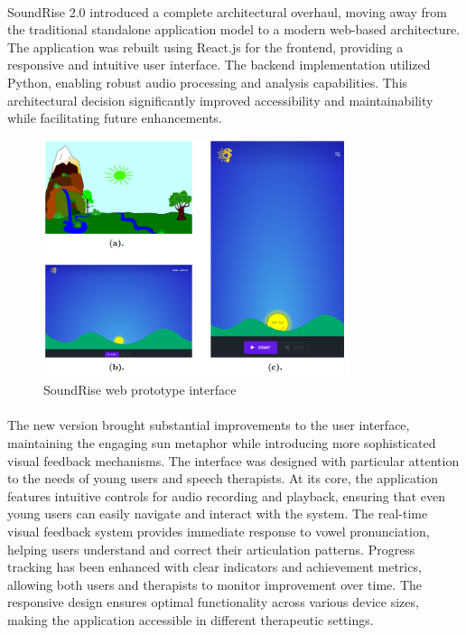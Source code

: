 \paragraph{}
SoundRise 2.0 introduced a complete architectural overhaul, moving away from the traditional standalone application model to a modern web-based architecture. The application was rebuilt using React.js for the frontend, providing a responsive and intuitive user interface. The backend implementation utilized Python, enabling robust audio processing and analysis capabilities. This architectural decision significantly improved accessibility and maintainability while facilitating future enhancements.

\begin{figure}[h]
    \centering
    \includegraphics[width=0.8\textwidth]{res/images/background/soundrise-2.png}
    \caption{SoundRise web prototype interface}
    \label{fig:soundrise-2}
\end{figure}

\paragraph{}
The new version brought substantial improvements to the user interface, maintaining the engaging sun metaphor while introducing more sophisticated visual feedback mechanisms. The interface was designed with particular attention to the needs of young users and speech therapists. At its core, the application features intuitive controls for audio recording and playback, ensuring that even young users can easily navigate and interact with the system. The real-time visual feedback system provides immediate response to vowel pronunciation, helping users understand and correct their articulation patterns. Progress tracking has been enhanced with clear indicators and achievement metrics, allowing both users and therapists to monitor improvement over time. The responsive design ensures optimal functionality across various device sizes, making the application accessible in different therapeutic settings.


